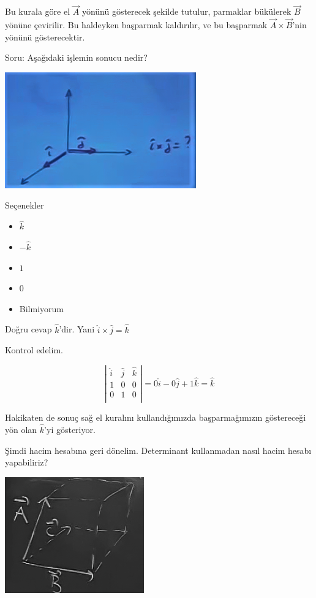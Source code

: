 \documentclass[12pt,fleqn]{article}\usepackage{../../common}
\begin{document}
Bu kurala göre el $\vec{A}$ yönünü gösterecek şekilde tutulur, parmaklar
bükülerek $\vec{B}$ yönüne çevirilir. Bu haldeyken başparmak kaldırılır, ve bu
başparmak $\vec{A} \times \vec{B}$'nin yönünü gösterecektir.

Soru: Aşağıdaki işlemin sonucu nedir?
\begin{center}
\includegraphics[height=5cm]{2_12.png}
\end{center}
Seçenekler
\begin{itemize}
   \item $\hat{k}$
   \item $-\hat{k}$
   \item $1$
   \item $0$
   \item Bilmiyorum
\end{itemize}

Doğru cevap $\hat{k}$'dir. Yani $\hat{i} \times \hat{j} = \hat{k}$

Kontrol edelim. 

$$ 
\left|\begin{array}{rrr}
\hat{i}& \hat{j}& \hat{k} \\
1 & 0 & 0 \\
0 & 1 & 0 \\
\end{array}\right| = 
0 \hat{i} - 0 \hat{j} + 1 \hat{k}  = 
\hat{k}
 $$

Hakikaten de sonuç sağ el kuralını kullandığımızda başparmağımızın göstereceği
yön olan $\hat{k}$'yi gösteriyor.

Şimdi hacim hesabına geri dönelim. Determinant kullanmadan nasıl hacim hesabı
yapabiliriz?

\begin{center}
\includegraphics[height=5cm]{2_13.png}
\end{center}
\end{document}
